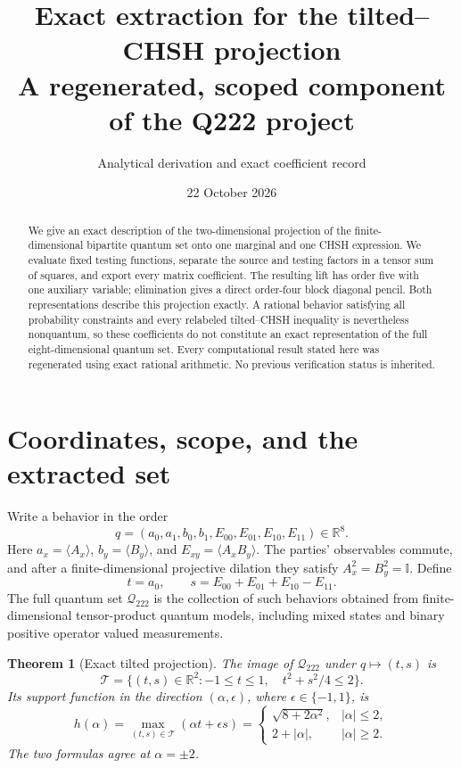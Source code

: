 \documentclass[11pt]{article}
\title{Exact extraction for the tilted--CHSH projection\\A regenerated, scoped component of the Q222 project}
\author{Analytical derivation and exact coefficient record}
\date{22 October 2026}
\newcommand{\Q}{{\mathcal Q_{222}}}
\newcommand{\R}{\mathbb R}
\newcommand{\T}{\mathcal T}
\newcommand{\Id}{\mathbb I}
\newtheorem{theorem}{Theorem}
\begin{document}
\maketitle

\begin{abstract}
We give an exact description of the two-dimensional projection of the finite-dimensional bipartite quantum set onto one marginal and one CHSH expression. We evaluate fixed testing functions, separate the source and testing factors in a tensor sum of squares, and export every matrix coefficient. The resulting lift has order five with one auxiliary variable; elimination gives a direct order-four block diagonal pencil. Both representations describe this projection exactly. A rational behavior satisfying all probability constraints and every relabeled tilted--CHSH inequality is nevertheless nonquantum, so these coefficients do not constitute an exact representation of the full eight-dimensional quantum set. Every computational result stated here was regenerated using exact rational arithmetic. No previous verification status is inherited.
\end{abstract}

\section{Coordinates, scope, and the extracted set}
Write a behavior in the order
\[
 q=(a_0,a_1,b_0,b_1,E_{00},E_{01},E_{10},E_{11})\in\R^8.
\]
Here $a_x=\langle A_x\rangle$, $b_y=\langle B_y\rangle$, and $E_{xy}=\langle A_xB_y\rangle$. The parties' observables commute, and after a finite-dimensional projective dilation they satisfy $A_x^2=B_y^2=\Id$. Define
\[
 t=a_0,\qquad s=E_{00}+E_{01}+E_{10}-E_{11}.
\]
The full quantum set $\Q$ is the collection of such behaviors obtained from finite-dimensional tensor-product quantum models, including mixed states and binary positive operator valued measurements.

\begin{theorem}[Exact tilted projection]\label{thm:projection}
The image of $\Q$ under $q\mapsto(t,s)$ is
\[
 \T=\{(t,s)\in\R^2: -1\le t\le1,\quad t^2+s^2/4\le2\}.
\]
Its support function in the direction $(\alpha,\epsilon)$, where $\epsilon\in\{-1,1\}$, is
\begin{equation}\label{eq:support}
 h(\alpha)=\max_{(t,s)\in\T}(\alpha t+\epsilon s)
 =\begin{cases}
 \sqrt{8+2\alpha^2},&|\alpha|\le2,\\
 2+|\alpha|,&|\alpha|\ge2.
 \end{cases}
\end{equation}
The two formulas agree at $\alpha=\pm2$.
\end{theorem}
\end{document}
